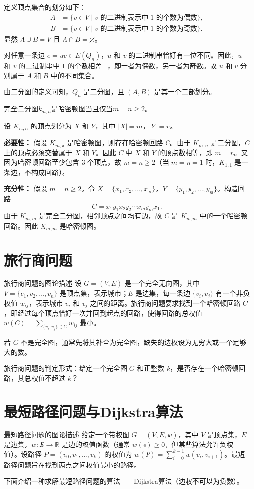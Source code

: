     定义顶点集合的划分如下：
    \begin{align*}
    A &= \{ v \in V \mid v \text{ 的二进制表示中 1 的个数为偶数} \}, \\
    B &= \{ v \in V \mid v \text{ 的二进制表示中 1 的个数为奇数} \}.
    \end{align*}
    显然 $A \cup B = V$ 且 $A \cap B = \varnothing$。

    对任意一条边 $e = uv \in E(Q_n)$，$u$ 和 $v$ 的二进制串恰好有一位不同。因此，$u$ 和 $v$ 的二进制串中 1 的个数相差 1，即一者为偶数，另一者为奇数。故 $u$ 和 $v$ 分别属于 $A$ 和 $B$ 中的不同集合。

    由二分图的定义可知，$Q_n$ 是二分图，且 $(A, B)$ 是其一个二部划分。
\begin{theorem}{}{}
    完全二分图$k_{m,n}$是哈密顿图当且仅当$m=n\geqslant 2$。
\end{theorem}
设 $K_{m,n}$ 的顶点划分为 $X$ 和 $Y$，其中 $|X| = m$，$|Y| = n$。

    \textbf{必要性：} 假设 $K_{m,n}$ 是哈密顿图，则存在哈密顿回路 $C$。由于 $K_{m,n}$ 是二分图，$C$ 上的顶点必须交替属于 $X$ 和 $Y$。因此 $C$ 中 $X$ 和 $Y$ 的顶点数相等，即 $m = n$。又因为哈密顿回路至少包含 3 个顶点，故 $m = n \ge 2$（当 $m=n=1$ 时，$K_{1,1}$ 是一条边，不构成回路）。

    \textbf{充分性：} 假设 $m = n \ge 2$。令 $X = \{x_1, x_2, \dots, x_m\}$，$Y = \{y_1, y_2, \dots, y_m\}$。构造回路
    \[
    C = x_1 y_1 x_2 y_2 \cdots x_m y_m x_1.
    \]
    由于 $K_{m,m}$ 是完全二分图，相邻顶点之间均有边，故 $C$ 是 $K_{m,m}$ 中的一个哈密顿回路。因此 $K_{m,m}$ 是哈密顿图。
\section{旅行商问题}
\begin{definition}{旅行商问题的图论描述}{}
设 $G=(V,E)$ 是一个完全无向图，其中 $V=\{v_1,v_2,\ldots,v_n\}$ 是顶点集，表示城市；$E$ 是边集，每一条边 $\{v_i,v_j\}$ 有一个非负权值 $w_{ij}$，表示城市 $v_i$ 和 $v_j$ 之间的距离。旅行商问题要求找到一个哈密顿回路 $C$，即经过每个顶点恰好一次并回到起点的回路，使得回路的总权值 $\displaystyle w(C)=\sum_{\{v_i,v_j\}\in C} w_{ij}$ 最小。

若 $G$ 不是完全图，通常先将其补全为完全图，缺失的边权设为无穷大或一个足够大的数。

旅行商问题的判定形式：给定一个完全图 $G$ 和正整数 $k$，是否存在一个哈密顿回路，其总权值不超过 $k$？
\end{definition}
\section{最短路径问题与Dijkstra算法}
\begin{definition}{最短路径问题的图论描述}{}
    给定一个带权图 $G=(V,E,w)$，其中 $V$ 是顶点集，$E$ 是边集，$w: E \to \mathbb{R}$ 是边的权值函数（通常 $w(e) \geqslant 0$，但某些算法允许负权值）。设路径 $P = (v_0, v_1, \ldots, v_k)$ 的权值为 $w(P) =\displaystyle \sum_{i=0}^{k-1} w(v_i, v_{i+1})$。最短路径问题旨在找到两点之间权值最小的路径。
\end{definition}
下面介绍一种求解最短路径问题的算法——Dijkstra算法（边权不可以为负数）。

